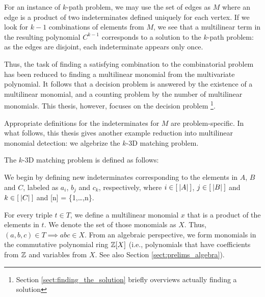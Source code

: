 For an instance of $k$-path problem, we may use the set of edges as $M$ where 
an edge is a product of two indeterminates defined uniquely for each vertex. 
If we look for $k-1$ combinations of elements from $M$, we see that a 
multilinear term in the resulting polynomial $C^{k-1}$ corresponds to a 
solution to the $k$-path problem: as the edges are disjoint, each indeterminate 
appears only once.

Thus, the task of finding a satisfying combination 
to the combinatorial problem has been reduced to 
finding a multilinear monomial from the multivariate polynomial.
It follows that a decision problem is answered by 
the existence of a multilinear monomial, 
and a counting problem by the number of multilinear monomials. 
This thesis, however, focuses on the decision problem
\footnote{Section \ref{sect:finding_the_solution} 
briefly overviews actually finding a solution}.

Appropriate definitions for the indeterminates for $M$ are problem-specific. 
In what follows, this thesis gives another example 
reduction into multilinear monomial detection: we algebrize the $k$-3D matching problem.

The $k$-3D matching problem is defined as follows:
\begin{problem}
\end{problem}

We begin by defining new indeterminates corresponding to the elements in $A$, $B$ and $C$, 
labeled as $a_i$, $b_j$ and $c_k$, respectively, where $i\in [\:{\left\vert A\right\vert}\:]$, $j\in
[\:{\left\vert B\right\vert}\:]$ and $k\in [\:{\left\vert C\right\vert}\:]$ and [\:n\:] = \{1,\ldots,n\}. 

For every triple $t \in T$, we define a multilinear monomial $x$ that is a
product of the elements in $t$. 
We denote the set of those monomials as $X$. 
Thus, $(a,b,c) \in T \implies abc \in X$.
From an algebraic perspective, we form monomials in the commutative polynomial 
ring $\mathbb Z[X]$ (i.e., polynomials that have coefficients from $\mathbb Z$ and variables from $X$. 
See also Section \ref{sect:prelims_algebra}). 

